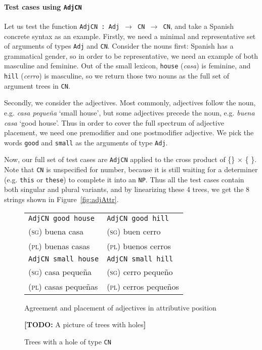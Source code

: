 \documentclass[11pt]{article}
\def\t#1{\texttt{#1}}
\newcommand{\todo}[1]{{\color{cyan}\textbf{[TODO: }#1\textbf{]}}}
\begin{document}
\paragraph{Test cases using \t{AdjCN}} Let us test the function
\t{AdjCN : Adj $\rightarrow$ CN $\rightarrow$ CN}, and take a Spanish
concrete syntax as an example. 
Firstly, we need a minimal and representative set of arguments of types
\t{Adj} and \t{CN}. Consider the nouns first: Spanish has a
grammatical gender, so in order to be representative, we need an
example of both masculine and feminine. Out of the small lexicon,
\t{house} (\emph{casa}) is feminine, and \t{hill} (\emph{cerro}) is
masculine, so we return those two nouns as the full set of argument
trees in \t{CN}. 

Secondly, we consider the adjectives. Most commonly, adjectives follow
the noun, e.g. \emph{casa peque\~{n}a} `small house', but some
adjectives precede the noun, e.g. \emph{buena casa} `good house'. Thus 
in order to cover the full spectrum of adjective placement, we need
one premodifier and one postmodifier adjective. We pick the words
\t{good} and \t{small} as the arguments of type \t{Adj}. 

Now, our full set of test cases are \t{AdjCN} applied to the cross
product of \{\}
$\times$ \{ \}.
Note that \t{CN} is unspecified for number, because it is still waiting for a
determiner (e.g. \t{this} or \t{these}) to complete it into an
\t{NP}. Thus all the test cases contain both singular and plural
variants, and by linearizing these 4 trees, we get the 8 strings shown
in Figure~\ref{fig:adjAttr}.

\begin{figure}
\centering
\begin{minipage}{.5\textwidth}
\centering
\begin{tabular}{| l | l |}
\hline
\t{AdjCN good house}   & \t{AdjCN good hill} \\ 
\textsc{(sg)} buena casa             & \textsc{(sg)} buen cerro \\
\textsc{(pl)} buenas casas           & \textsc{(pl)} buenos cerros \\ \hline

\t{AdjCN small house}   & \t{AdjCN small hill} \\ 
\textsc{(sg)} casa  peque\~{n}a            & \textsc{(sg)} cerro  peque\~{n}o \\
\textsc{(pl)} casas  peque\~{n}as          & \textsc{(pl)} cerros  peque\~{n}os \\ \hline
\end{tabular}
\caption{Agreement and placement of adjectives in attributive position}
\label{fig:adjAttr}
\end{minipage}%
\begin{minipage}{.5\textwidth}
  \centering
  \todo{A picture of trees with holes}
 \caption{Trees with a hole of type \t{CN}}
\label{fig:treesWithHoles}
\end{minipage}
\end{figure}
\end{document}
